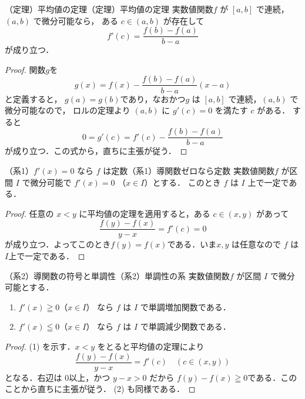 \begin{example}{（定理）平均値の定理}{（定理）平均値の定理}
  実数値関数$f$ が $[a,b]$ で連続，$(a,b)$ で微分可能なら，
  ある $c \in(a,b)$ が存在して
  \[
    f'(c)=\frac{f(b)-f(a)}{b-a}
  \]
  が成り立つ．
\end{example}

\begin{tleftbar}
\begin{proof}
  関数$g$を
  \[
    g(x)=f(x)-\frac{f(b)-f(a)}{b-a}(x-a)
  \]
  と定義すると， $g(a)=g(b)$であり，なおかつ$g$ は $[a,b]$ で連続，$(a,b)$ で微分可能なので，
  ロルの定理より $(a,b)$ に $g'(c)=0$ を満たす $c$ がある．
  すると
  \[
    0=g'(c)=f'(c)-\frac{f(b)-f(a)}{b-a}
  \]
  が成り立つ．この式から，直ちに主張が従う．
\end{proof}
\end{tleftbar}

\begin{example}{（系1）$f'(x)=0$ なら $f$ は定数}{（系1）導関数ゼロなら定数}
  実数値関数$f$ が区間 $I$ で微分可能で $f'(x)=0$ （$x \in I$）とする．
  このとき $f$ は $I$ 上で一定である．
\end{example}

\begin{tleftbar}
\begin{proof}
  任意の $x<y$ に平均値の定理を適用すると，ある $c\in(x,y)$ があって
  \[
     \frac{f(y)-f(x)}{y-x}=f'(c)=0
  \]
  が成り立つ．よってこのとき$f(y)=f(x)$である．いま$x,y$ は任意なので $f$ は$I$上で一定である．
\end{proof}
\end{tleftbar}

\begin{example}{（系2）導関数の符号と単調性}{（系2）単調性の系}
  実数値関数$f$ が区間 $I$ で微分可能とする．
  \begin{enumerate}
    \item $f'(x)\geqq 0$（$x\in I$） なら $f$ は $I$ で単調増加関数である．
    \item $f'(x)\leqq 0$（$x\in I$） なら $f$ は $I$ で単調減少関数である．
  \end{enumerate}
\end{example}

\begin{tleftbar}
\begin{proof}
  (1) を示す．$x<y$ をとると平均値の定理により
  \[
     \frac{f(y)-f(x)}{y-x}=f'(c) \quad (c\in(x,y))
  \]
  となる．右辺は $0$以上，かつ $y-x>0$ だから $f(y)-f(x)\geqq 0$である．このことから直ちに主張が従う．
  (2) も同様である．
\end{proof}
\end{tleftbar}

